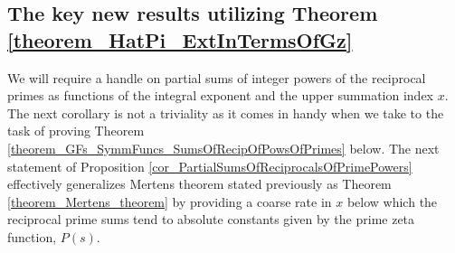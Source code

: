 \documentclass[11pt,reqno,a4letter]{article}
\numberwithin{figure}{section}
\numberwithin{table}{section}
\theoremstyle{plain}
\numberwithin{theorem}{section}
\theoremstyle{definition}
\begin{document}
\subsection{The key new results utilizing Theorem \ref{theorem_HatPi_ExtInTermsOfGz}} 
\label{subSection_PartialPrimeProducts_Proofs} 

We will require a handle on partial sums of integer powers of the reciprocal primes as 
functions of the integral exponent and the upper summation index $x$. 
The next corollary is not a triviality as it comes in handy when we take to the task of 
proving Theorem \ref{theorem_GFs_SymmFuncs_SumsOfRecipOfPowsOfPrimes} below. 
The next statement of Proposition \ref{cor_PartialSumsOfReciprocalsOfPrimePowers} 
effectively generalizes Mertens theorem stated previously as Theorem \ref{theorem_Mertens_theorem} 
by providing a coarse rate in $x$ below which the reciprocal prime sums tend to 
absolute constants given by the prime zeta function, $P(s)$. 
\end{document}
